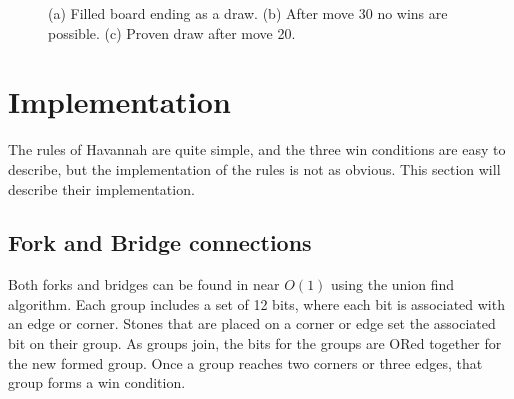\begin{figure}
	\centering
	\subfloat[]{\label{fig:drawproven}
		\begin{HavannahBoard}[board size=4,coordinate style=classical,show coordinates=false]
		\HGame{g7,a1,f5,g4,e3,d2,e2,d1,c2,d3,c3,f7,d6,b4,a4,b5,a3,e5,c4,b3}%
		\end{HavannahBoard}
	}
	\caption{(a) Filled board ending as a draw. (b) After move 30 no wins are possible. (c) Proven draw after move 20.}
	\label{fig:draw}
\end{figure}




\section{Implementation}

The rules of Havannah are quite simple, and the three win conditions are easy to describe, but the implementation of the rules is not as obvious. This section will describe their implementation.

\subsection{Fork and Bridge connections}

Both forks and bridges can be found in near $O(1)$ using the union find algorithm. Each group includes a set of 12 bits, where each bit is associated with an edge or corner. Stones that are placed on a corner or edge set the associated bit on their group. As groups join, the bits for the groups are ORed together for the new formed group. Once a group reaches two corners or three edges, that group forms a win condition.

